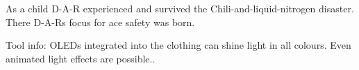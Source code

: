 \begin{npcBox}[title=Pioneer: Drop-and-run]
    \begin{stressSection}
    \end{stressSection}
    \begin{tabularx}{\textwidth}{ XX }
    \end{tabularx}

    \begin{consequences}
    \item {}
    \item {}
    \item {}
    \end{consequences}

    \begin{npcDescription}

    As a child D-A-R experienced and survived the Chili-and-liquid-nitrogen disaster. There D-A-Rs focus for ace safety was born.

    Tool info: OLEDs integrated into the clothing can shine light in all colours. Even animated light effects are possible..

    \end{npcDescription}

\end{npcBox}

\newpage


